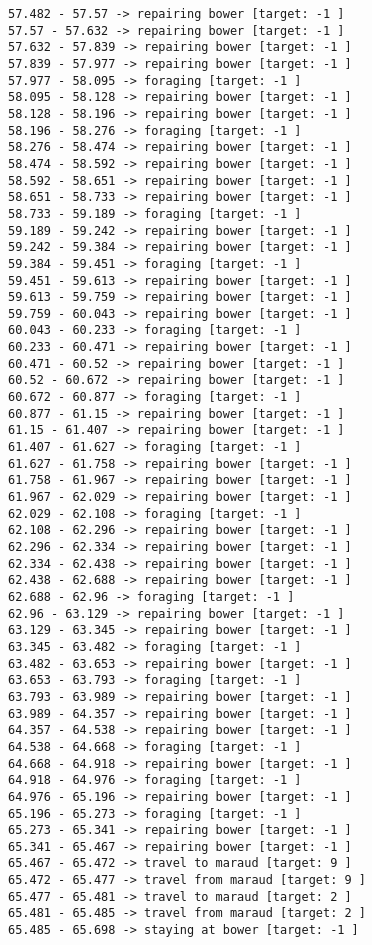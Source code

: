 \documentclass[11pt]{article}
\begin{document}
\begin{Verbatim}[commandchars=\\\{\}]
57.482 - 57.57 -> repairing bower [target: -1 ]
57.57 - 57.632 -> repairing bower [target: -1 ]
57.632 - 57.839 -> repairing bower [target: -1 ]
57.839 - 57.977 -> repairing bower [target: -1 ]
57.977 - 58.095 -> foraging [target: -1 ]
58.095 - 58.128 -> repairing bower [target: -1 ]
58.128 - 58.196 -> repairing bower [target: -1 ]
58.196 - 58.276 -> foraging [target: -1 ]
58.276 - 58.474 -> repairing bower [target: -1 ]
58.474 - 58.592 -> repairing bower [target: -1 ]
58.592 - 58.651 -> repairing bower [target: -1 ]
58.651 - 58.733 -> repairing bower [target: -1 ]
58.733 - 59.189 -> foraging [target: -1 ]
59.189 - 59.242 -> repairing bower [target: -1 ]
59.242 - 59.384 -> repairing bower [target: -1 ]
59.384 - 59.451 -> foraging [target: -1 ]
59.451 - 59.613 -> repairing bower [target: -1 ]
59.613 - 59.759 -> repairing bower [target: -1 ]
59.759 - 60.043 -> repairing bower [target: -1 ]
60.043 - 60.233 -> foraging [target: -1 ]
60.233 - 60.471 -> repairing bower [target: -1 ]
60.471 - 60.52 -> repairing bower [target: -1 ]
60.52 - 60.672 -> repairing bower [target: -1 ]
60.672 - 60.877 -> foraging [target: -1 ]
60.877 - 61.15 -> repairing bower [target: -1 ]
61.15 - 61.407 -> repairing bower [target: -1 ]
61.407 - 61.627 -> foraging [target: -1 ]
61.627 - 61.758 -> repairing bower [target: -1 ]
61.758 - 61.967 -> repairing bower [target: -1 ]
61.967 - 62.029 -> repairing bower [target: -1 ]
62.029 - 62.108 -> foraging [target: -1 ]
62.108 - 62.296 -> repairing bower [target: -1 ]
62.296 - 62.334 -> repairing bower [target: -1 ]
62.334 - 62.438 -> repairing bower [target: -1 ]
62.438 - 62.688 -> repairing bower [target: -1 ]
62.688 - 62.96 -> foraging [target: -1 ]
62.96 - 63.129 -> repairing bower [target: -1 ]
63.129 - 63.345 -> repairing bower [target: -1 ]
63.345 - 63.482 -> foraging [target: -1 ]
63.482 - 63.653 -> repairing bower [target: -1 ]
63.653 - 63.793 -> foraging [target: -1 ]
63.793 - 63.989 -> repairing bower [target: -1 ]
63.989 - 64.357 -> repairing bower [target: -1 ]
64.357 - 64.538 -> repairing bower [target: -1 ]
64.538 - 64.668 -> foraging [target: -1 ]
64.668 - 64.918 -> repairing bower [target: -1 ]
64.918 - 64.976 -> foraging [target: -1 ]
64.976 - 65.196 -> repairing bower [target: -1 ]
65.196 - 65.273 -> foraging [target: -1 ]
65.273 - 65.341 -> repairing bower [target: -1 ]
65.341 - 65.467 -> repairing bower [target: -1 ]
65.467 - 65.472 -> travel to maraud [target: 9 ]
65.472 - 65.477 -> travel from maraud [target: 9 ]
65.477 - 65.481 -> travel to maraud [target: 2 ]
65.481 - 65.485 -> travel from maraud [target: 2 ]
65.485 - 65.698 -> staying at bower [target: -1 ]

\end{Verbatim}
\end{document}
